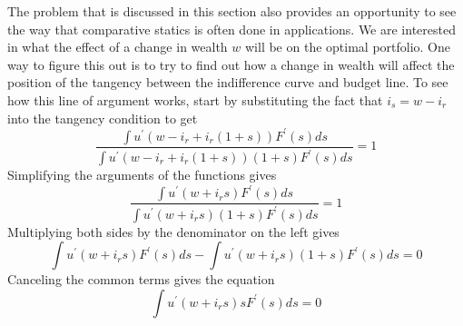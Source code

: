 \documentclass[12pt]{article}
\begin{document}
The problem that is discussed in this section also provides an opportunity to
see the way that comparative statics is often done in applications. We are
interested in what the effect of a change in wealth $w$ will be on the optimal
portfolio. One way to figure this out is to try to find out how a change in
wealth will affect the position of the tangency between the indifference curve
and budget line. To see how this line of argument works, start by substituting
the fact that $i_{s}=w-i_{r}$ into the tangency condition to get%
\[
\frac{\int u^{\prime}\left(  w-i_{r}+i_{r}\left(  1+s\right)  \right)
F^{\prime}\left(  s\right)  ds}{\int u^{\prime}\left(  w-i_{r}+i_{r}\left(
1+s\right)  \right)  \left(  1+s\right)  F^{\prime}\left(  s\right)  ds}=1
\]
Simplifying the arguments of the functions gives%
\[
\frac{\int u^{\prime}\left(  w+i_{r}s\right)  F^{\prime}\left(  s\right)
ds}{\int u^{\prime}\left(  w+i_{r}s\right)  \left(  1+s\right)  F^{\prime
}\left(  s\right)  ds}=1
\]
Multiplying both sides by the denominator on the left gives%
\[
\int u^{\prime}\left(  w+i_{r}s\right)  F^{\prime}\left(  s\right)  ds-\int
u^{\prime}\left(  w+i_{r}s\right)  \left(  1+s\right)  F^{\prime}\left(
s\right)  ds=0
\]
Canceling the common terms gives the equation%
\begin{equation}
\int u^{\prime}\left(  w+i_{r}s\right)  sF^{\prime}\left(  s\right)
ds=0\label{FOC}%
\end{equation}
\end{document}
